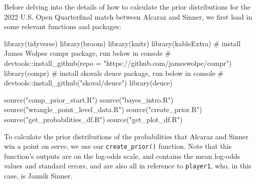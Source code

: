 \documentclass[
  letterpaper,
  DIV=11,
  numbers=noendperiod]{scrartcl}
\newenvironment{Shaded}{\begin{snugshade}}{\end{snugshade}}
\newcommand{\CommentTok}[1]{\textcolor[rgb]{0.37,0.37,0.37}{#1}}
\newcommand{\FunctionTok}[1]{\textcolor[rgb]{0.28,0.35,0.67}{#1}}
\newcommand{\NormalTok}[1]{\textcolor[rgb]{0.00,0.23,0.31}{#1}}
\newcommand{\StringTok}[1]{\textcolor[rgb]{0.13,0.47,0.30}{#1}}
\begin{document}
Before delving into the details of how to calculate the prior
distributions for the 2022 U.S. Open Quarterfinal match between Alcaraz
and Sinner, we first load in some relevant functions and packages:

\linespread{0.9}

\begin{Shaded}
\begin{Highlighting}[]
\FunctionTok{library}\NormalTok{(tidyverse)}
\FunctionTok{library}\NormalTok{(broom)}
\FunctionTok{library}\NormalTok{(knitr)}
\FunctionTok{library}\NormalTok{(kableExtra)}
\CommentTok{\# install James Wolpe\textquotesingle{}s compr package, run below in console}
\CommentTok{\# devtools::install\_github(repo = "https://github.com/jameswolpe/compr")}
\FunctionTok{library}\NormalTok{(compr)}
\CommentTok{\# install skoval\textquotesingle{}s deuce package, run below in console}
\CommentTok{\# devtools::install\_github("skoval/deuce")}
\FunctionTok{library}\NormalTok{(deuce)}

\FunctionTok{source}\NormalTok{(}\StringTok{"comp\_prior\_start.R"}\NormalTok{)}
\FunctionTok{source}\NormalTok{(}\StringTok{"bayes\_intro.R"}\NormalTok{)}
\FunctionTok{source}\NormalTok{(}\StringTok{"wrangle\_point\_level\_data.R"}\NormalTok{)}
\FunctionTok{source}\NormalTok{(}\StringTok{"create\_prior.R"}\NormalTok{)}
\FunctionTok{source}\NormalTok{(}\StringTok{"get\_probabilities\_df.R"}\NormalTok{)}
\FunctionTok{source}\NormalTok{(}\StringTok{"get\_plot\_df.R"}\NormalTok{)}
\end{Highlighting}
\end{Shaded}

\linespread{2}

To calculate the prior distributions of the probabilities that Alcaraz
and Sinner win a point on serve, we use our \texttt{create\_prior()}
function. Note that this function's outputs are on the log-odds scale,
and contains the mean log-odds values and standard errors, and are also
all in reference to \texttt{player1}, who, in this case, is Jannik
Sinner.

\linespread{0.9}
\end{document}
